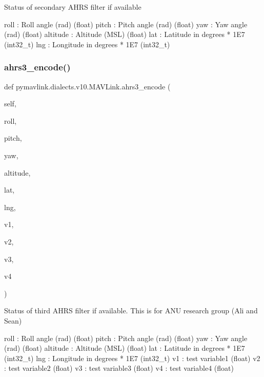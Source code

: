 \begin{DoxyVerb}Status of secondary AHRS filter if available

roll                      : Roll angle (rad) (float)
pitch                     : Pitch angle (rad) (float)
yaw                       : Yaw angle (rad) (float)
altitude                  : Altitude (MSL) (float)
lat                       : Latitude in degrees * 1E7 (int32_t)
lng                       : Longitude in degrees * 1E7 (int32_t)\end{DoxyVerb}
 \mbox{\label{classpymavlink_1_1dialects_1_1v10_1_1MAVLink_abcfbdffd76437891ab53a83c336e1f1a}} 
\subsubsection{\texorpdfstring{ahrs3\+\_\+encode()}{ahrs3\_encode()}}
{\footnotesize\ttfamily def pymavlink.\+dialects.\+v10.\+M\+A\+V\+Link.\+ahrs3\+\_\+encode (\begin{DoxyParamCaption}\item[{}]{self,  }\item[{}]{roll,  }\item[{}]{pitch,  }\item[{}]{yaw,  }\item[{}]{altitude,  }\item[{}]{lat,  }\item[{}]{lng,  }\item[{}]{v1,  }\item[{}]{v2,  }\item[{}]{v3,  }\item[{}]{v4 }\end{DoxyParamCaption})}

\begin{DoxyVerb}Status of third AHRS filter if available. This is for ANU research
group (Ali and Sean)

roll                      : Roll angle (rad) (float)
pitch                     : Pitch angle (rad) (float)
yaw                       : Yaw angle (rad) (float)
altitude                  : Altitude (MSL) (float)
lat                       : Latitude in degrees * 1E7 (int32_t)
lng                       : Longitude in degrees * 1E7 (int32_t)
v1                        : test variable1 (float)
v2                        : test variable2 (float)
v3                        : test variable3 (float)
v4                        : test variable4 (float)\end{DoxyVerb}
 \mbox{\label{classpymavlink_1_1dialects_1_1v10_1_1MAVLink_a3ca3a3b388e1c8c00e591a03418e97a7}} 
